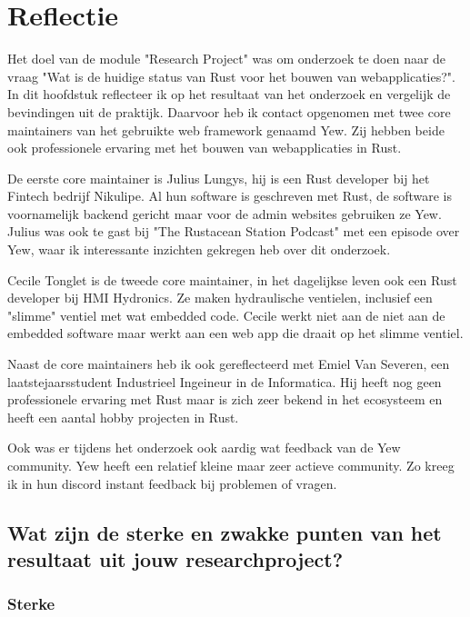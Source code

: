 \chapter{Reflectie}

Het doel van de module "Research Project" was om onderzoek te doen naar de vraag "Wat is de huidige
status van Rust voor het bouwen van webapplicaties?". In dit hoofdstuk reflecteer ik op het
resultaat van het onderzoek en vergelijk de bevindingen uit de praktijk. Daarvoor heb ik contact
opgenomen met twee core maintainers van het gebruikte web framework genaamd Yew. Zij hebben beide
ook professionele ervaring met het bouwen van webapplicaties in Rust.

De eerste core maintainer is Julius Lungys, hij is een Rust developer bij het Fintech bedrijf
Nikulipe. Al hun software is geschreven met Rust, de software is voornamelijk backend gericht
maar voor de admin websites gebruiken ze Yew. Julius was ook te gast bij "The Rustacean Station Podcast"
met een episode over Yew, waar ik interessante inzichten gekregen heb over dit onderzoek.

Cecile Tonglet is de tweede core maintainer, in het dagelijkse leven ook een Rust developer
bij HMI Hydronics. Ze maken hydraulische ventielen, inclusief een "slimme" ventiel met wat embedded
code. Cecile werkt niet aan de niet aan de embedded software maar werkt aan een web app die draait 
op het slimme ventiel.

Naast de core maintainers heb ik ook gereflecteerd met Emiel Van Severen, een laatstejaarsstudent
Industrieel Ingeineur in de Informatica. Hij heeft nog geen professionele ervaring met Rust maar
is zich zeer bekend in het ecosysteem en heeft een aantal hobby projecten in Rust.

Ook was er tijdens het onderzoek ook aardig wat feedback van de Yew community. Yew heeft een
relatief kleine maar zeer actieve community. Zo kreeg ik in hun discord instant feedback bij
problemen of vragen.


\clearpage

\section{Wat zijn de sterke en zwakke punten van het resultaat uit jouw researchproject?}

\subsection{Sterke}

